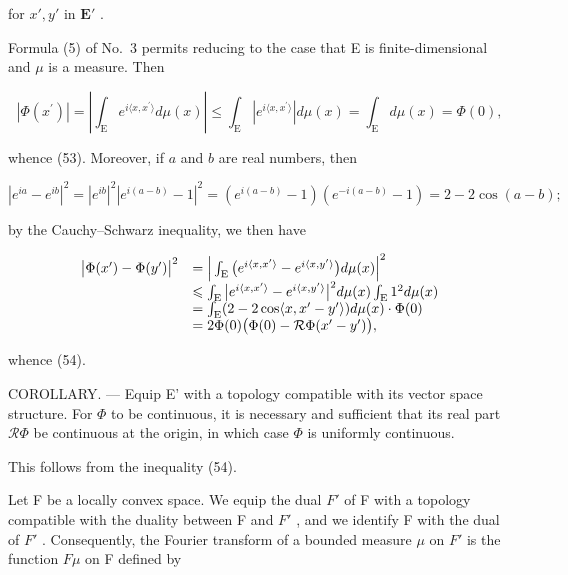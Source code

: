 for \(x', y'\) in \(\mathbf{E}'\) .

Formula (5) of No.~3 permits reducing to the case that E is finite-dimensional and \(\mu\) is a measure. Then

\[
\left| \Phi (x ^ {\prime}) \right| = \left| \int_ {\mathrm{E}} e ^ {i \langle x, x ^ {\prime} \rangle} d \mu (x) \right| \leqslant \int_ {\mathrm{E}} | e ^ {i \langle x, x ^ {\prime} \rangle} | d \mu (x) = \int_ {\mathrm{E}} d \mu (x) = \Phi (0),
\]

whence (53). Moreover, if \(a\) and \(b\) are real numbers, then

\[
\left| e ^ {i a} - e ^ {i b} \right| ^ {2} = \left| e ^ {i b} \right| ^ {2} \left| e ^ {i (a - b)} - 1 \right| ^ {2} = \left(e ^ {i (a - b)} - 1\right) \left(e ^ {- i (a - b)} - 1\right) = 2 - 2 \cos (a - b);
\]

by the Cauchy--Schwarz inequality, we then have

\[
\begin{array}{r l} \big | \Phi (x ^ {\prime}) - \Phi (y ^ {\prime}) \big | ^ {2} & = \Big | \int_ {\mathrm{E}} \big (e ^ {i \langle x, x ^ {\prime} \rangle} - e ^ {i \langle x, y ^ {\prime} \rangle} \big) d \mu (x) \Big | ^ {2} \\ & \leqslant \int_ {\mathrm{E}} \big | e ^ {i \langle x, x ^ {\prime} \rangle} - e ^ {i \langle x, y ^ {\prime} \rangle} \big | ^ {2} d \mu (x) \int_ {\mathrm{E}} 1 ^ {2} d \mu (x) \\ & = \int_ {\mathrm{E}} (2 - 2 \cos \langle x, x ^ {\prime} - y ^ {\prime} \rangle) d \mu (x) \cdot \Phi (0) \\ & = 2 \Phi (0) \big (\Phi (0) - \mathcal {R} \Phi (x ^ {\prime} - y ^ {\prime}) \big), \end{array}
\]

whence (54).

COROLLARY. --- Equip E' with a topology compatible with its vector space structure. For \(\Phi\) to be continuous, it is necessary and sufficient that its real part \(\mathcal{R}\Phi\) be continuous at the origin, in which case \(\Phi\) is uniformly continuous.

This follows from the inequality (54).

Let F be a locally convex space. We equip the dual \(F'\) of F with a topology compatible with the duality between F and \(F'\) , and we identify F with the dual of \(F'\) . Consequently, the Fourier transform of a bounded measure \(\mu\) on \(F'\) is the function \(F\mu\) on F defined by

